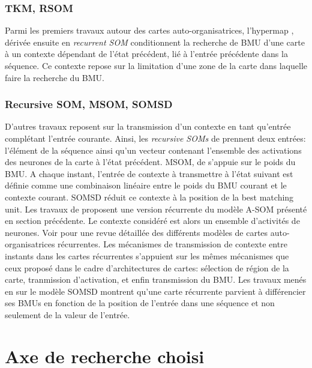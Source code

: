 \documentclass[../main]{subfiles}
\begin{document}
\subsubsection{ TKM, RSOM}

Parmi les premiers travaux autour des cartes auto-organisatrices, l'hypermap \cite{Kohonen1991THEHA}, dérivée ensuite en \emph{recurrent SOM} \cite{varsta_temporal_2001} conditionnent la recherche de BMU d'une carte à un contexte dépendant de l'état précédent, lié à l'entrée précédente dans la séquence. Ce contexte repose sur la limitation d'une zone de la carte dans laquelle faire la recherche du BMU. 

\subsubsection{Recursive SOM, MSOM, SOMSD}

D'autres travaux reposent sur la transmission d'un contexte en tant qu'entrée complétant l'entrée courante. 
Ainsi, les \emph{recursive SOMs} de \cite{Voegtlin2002RecursiveSM} prennent deux entrées: l'élément de la séquence ainsi qu'un vecteur contenant l'ensemble des activations des neurones de la carte à l'état précédent.
MSOM, de \cite{Strickert2005MergeSF} s'appuie sur le poids du BMU. A chaque instant, l'entrée de contexte à transmettre à l'état suivant est définie comme une combinaison linéaire entre le poids du BMU courant et le contexte courant.
SOMSD \cite{hagenbuchner_self-organizing_2003, hammer_recursive_2004,hammer_self-organizing_2005, fix20} réduit ce contexte à la position de la best matching unit.
Les travaux de \cite{Buonamente2013SimulatingAW} proposent une version récurrente du modèle A-SOM présenté en section précédente. Le contexte considéré est alors un ensemble d'activités de neurones.
Voir \cite{khouzam_neural_2014} pour une revue détaillée des différents modèles de cartes auto-organisatrices récurrentes.
Les mécanismes de transmission de contexte entre instants dans les cartes récurrentes s'appuient sur les mêmes mécanismes que ceux proposé dans le cadre d'architectures de cartes: sélection de région de la carte, tranmission d'activation, et enfin transmission du BMU.
Les travaux menés en \cite{fix20} sur le modèle SOMSD montrent qu'une carte récurrente parvient à différencier ses BMUs en fonction de la position de l'entrée dans une séquence et non seulement de la valeur de l'entrée.


\section{Axe de recherche choisi}
\end{document}
